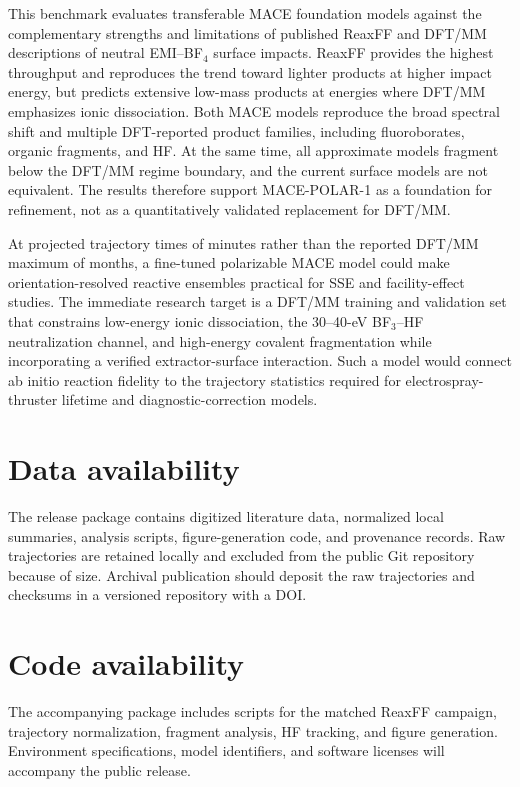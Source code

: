 \documentclass[preprint,review,12pt]{elsarticle}
\begin{document}
This benchmark evaluates transferable MACE foundation models against the
complementary strengths and limitations of published ReaxFF and DFT/MM
descriptions of neutral EMI--BF$_4$ surface impacts. ReaxFF provides the
highest throughput and reproduces the trend toward lighter products at higher
impact energy, but predicts extensive low-mass products at energies where
DFT/MM emphasizes ionic dissociation. Both MACE models reproduce the broad
spectral shift and multiple DFT-reported product families, including
fluoroborates, organic fragments, and HF. At the same time, all approximate
models fragment below the DFT/MM regime boundary, and the current surface
models are not equivalent. The results therefore support MACE-POLAR-1 as a
foundation for refinement, not as a quantitatively validated replacement for
DFT/MM.

At projected trajectory times of minutes rather than the reported DFT/MM
maximum of months, a fine-tuned polarizable MACE model could make
orientation-resolved reactive ensembles practical for SSE and facility-effect
studies. The immediate research target is a DFT/MM training and validation set
that constrains low-energy ionic dissociation, the 30--40-eV BF$_3$--HF
neutralization channel, and high-energy covalent fragmentation while
incorporating a verified extractor-surface interaction. Such a model would
connect ab initio reaction fidelity to the trajectory statistics required for
electrospray-thruster lifetime and diagnostic-correction models.

\section*{Data availability}

The release package contains digitized literature data, normalized local
summaries, analysis scripts, figure-generation code, and provenance records.
Raw trajectories are retained locally and excluded from the public Git
repository because of size. Archival publication should deposit the raw
trajectories and checksums in a versioned repository with a DOI.

\section*{Code availability}

The accompanying package includes scripts for the matched ReaxFF campaign,
trajectory normalization, fragment analysis, HF tracking, and figure
generation. Environment specifications, model identifiers, and software
licenses will accompany the public release.
\end{document}

